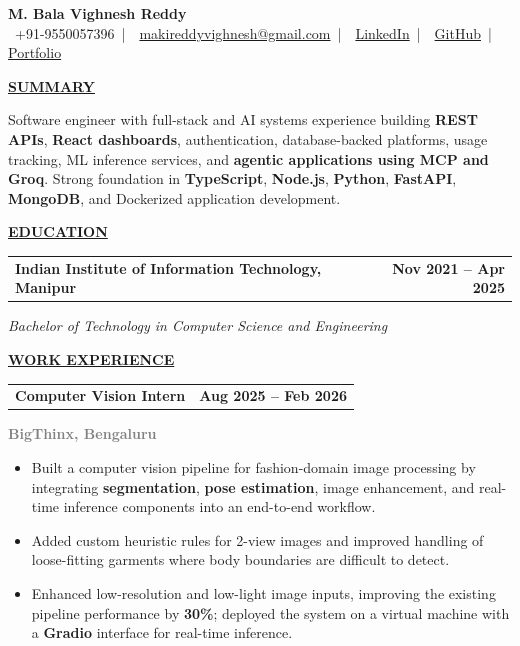 \documentclass[a4paper,11pt]{article}
\newcommand{\TitleText}[1]{\textbf{\large #1}}
\newcommand{\BlackBold}[1]{\textbf{#1}}
\newcommand{\GrayText}[1]{\textcolor{graytext}{\textbf{#1}}}
\newcommand{\SectionHeader}[1]{%
  \vspace{2mm}%
  \begin{center}
    {\large\textbf{\underline{#1}}}%
  \end{center}
  \vspace{-2mm}%
}
\begin{document}
\begin{center}
  {\Large\selectfont\textbf{M. Bala Vighnesh Reddy}}\\[5pt]
  {\fontsize{11pt}{13pt}\selectfont
    \faPhone \, +91-9550057396
    \,|\,
    \faEnvelope \, \href{mailto:makireddyvighnesh@gmail.com}{\textcolor{linkblue}{makireddyvighnesh@gmail.com}}
    \,|\,
    \faLinkedin \, \href{https://www.linkedin.com/in/makireddy-bala-vighnesh-324278253}{\textcolor{linkblue}{LinkedIn}}
    \,|\,
    \faGithub \, \href{https://github.com/Makireddyvighnesh}{\textcolor{linkblue}{GitHub}}
    \,|\,
    \href{https://makireddyvighnesh.github.io/Makireddyvighnesh/}{\textcolor{linkblue}{Portfolio}}
  }
\end{center}

\SectionHeader{SUMMARY}
Software engineer with full-stack and AI systems experience building \BlackBold{REST APIs}, \BlackBold{React dashboards}, authentication, database-backed platforms, usage tracking, ML inference services, and \BlackBold{agentic applications using MCP and Groq}. Strong foundation in \BlackBold{TypeScript}, \BlackBold{Node.js}, \BlackBold{Python}, \BlackBold{FastAPI}, \BlackBold{MongoDB}, and Dockerized application development.

\SectionHeader{EDUCATION}
\begin{tabularx}{\textwidth}{@{} X r @{}}
  {\TitleText{Indian Institute of Information Technology, Manipur}} & {\large \textbf{Nov 2021 -- Apr 2025}} \\
\end{tabularx}
\textit{Bachelor of Technology in Computer Science and Engineering}

\SectionHeader{WORK EXPERIENCE}

\begin{tabularx}{\textwidth}{@{} X r @{}}
  {\TitleText{Computer Vision Intern}} & {\large \textbf{Aug 2025 -- Feb 2026}} \\
\end{tabularx}
\GrayText{BigThinx, Bengaluru}\\[-3mm]
{\normalsize
\begin{itemize}
  \item Built a computer vision pipeline for fashion-domain image processing by integrating \BlackBold{segmentation}, \BlackBold{pose estimation}, image enhancement, and real-time inference components into an end-to-end workflow.
  \item Added custom heuristic rules for 2-view images and improved handling of loose-fitting garments where body boundaries are difficult to detect.
  \item Enhanced low-resolution and low-light image inputs, improving the existing pipeline performance by \BlackBold{30\%}; deployed the system on a virtual machine with a \BlackBold{Gradio} interface for real-time inference.
\end{itemize}
}
\end{document}
